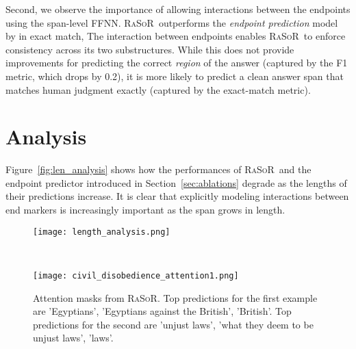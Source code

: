 \documentclass{article} \usepackage{iclr2017_conference,times}
\newcommand{\ourmodel}{\textsc{RaSoR}}
\begin{document}
Second, we observe the importance of allowing interactions between the endpoints using the span-level FFNN. \ourmodel~outperforms the \textit{endpoint prediction} model by  in exact match,
The interaction between endpoints enables \ourmodel~to enforce consistency across its two substructures.
While this does not provide improvements for predicting the correct \textit{region} of the answer (captured by the F1 metric, which drops by 0.2), it is more likely to predict a clean answer span that matches human judgment exactly (captured by the exact-match metric).
 

\newcommand{\hlwt}[2]{{\sethlcolor{#1}\hl{#2}}}


\section{Analysis}
\label{sec:analysis}

Figure~\ref{fig:len_analysis} shows how the performances of \ourmodel~and the endpoint predictor introduced in Section~\ref{sec:ablations} degrade as the lengths of their predictions increase.
It is clear that explicitly modeling interactions between end markers is increasingly important as the span grows in length.

\begin{figure}[hbp]
\begin{center}
\begin{minipage}{.3\textwidth}
\texttt{[image: length\_analysis.png]}
\caption{F1 and Exact Match (EM) accuracy of \ourmodel~and the endpoint predictor baseline over different prediction lengths.}
\label{fig:len_analysis}
\end{minipage}~~~~~~~\begin{minipage}{.65\textwidth}
\texttt{[image: civil\_disobedience\_attention1.png]}
\caption{Attention masks from \ourmodel. Top predictions for the first example are 'Egyptians', 'Egyptians against the British', 'British'.  Top predictions for the second are 'unjust laws', 'what they deem to be unjust laws', 'laws'.}
\label{fig:attention}
\end{minipage}

\end{center}
\end{figure}
\end{document}
